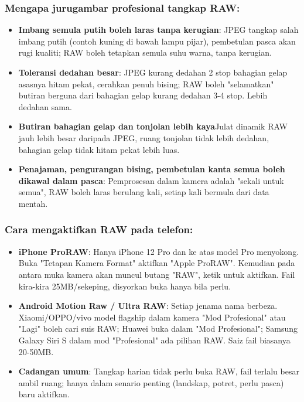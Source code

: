 \subsubsection*{Mengapa jurugambar profesional tangkap RAW:}

\begin{itemize}
  \item \textbf{Imbang semula putih boleh laras tanpa kerugian}: JPEG tangkap salah imbang putih (contoh kuning di bawah lampu pijar), pembetulan pasca akan rugi kualiti; RAW boleh tetapkan semula suhu warna, tanpa kerugian.
  \item \textbf{Toleransi dedahan besar}: JPEG kurang dedahan 2 stop bahagian gelap asasnya hitam pekat, cerahkan penuh bising; RAW boleh "selamatkan" butiran berguna dari bahagian gelap kurang dedahan 3-4 stop. Lebih dedahan sama.
  \item \textbf{Butiran bahagian gelap dan tonjolan lebih kaya}Julat dinamik RAW jauh lebih besar daripada JPEG, ruang tonjolan tidak lebih dedahan, bahagian gelap tidak hitam pekat lebih luas.
  \item \textbf{Penajaman, pengurangan bising, pembetulan kanta semua boleh dikawal dalam pasca}: Pemprosesan dalam kamera adalah "sekali untuk semua", RAW boleh laras berulang kali, setiap kali bermula dari data mentah.
\end{itemize}

\subsubsection*{Cara mengaktifkan RAW pada telefon:}

\begin{itemize}
  \item \textbf{iPhone ProRAW}: Hanya iPhone 12 Pro dan ke atas model Pro menyokong. Buka "Tetapan Kamera Format" aktifkan "Apple ProRAW". Kemudian pada antara muka kamera akan muncul butang "RAW", ketik untuk aktifkan. Fail kira-kira 25MB/sekeping, disyorkan buka hanya bila perlu.
  \item \textbf{Android Motion Raw / Ultra RAW}: Setiap jenama nama berbeza. Xiaomi/OPPO/vivo model flagship dalam kamera "Mod Profesional" atau "Lagi" boleh cari suis RAW; Huawei buka dalam "Mod Profesional"; Samsung Galaxy Siri S dalam mod "Profesional" ada pilihan RAW. Saiz fail biasanya 20-50MB.
  \item \textbf{Cadangan umum}: Tangkap harian tidak perlu buka RAW, fail terlalu besar ambil ruang; hanya dalam senario penting (landskap, potret, perlu pasca) baru aktifkan.
\end{itemize}

